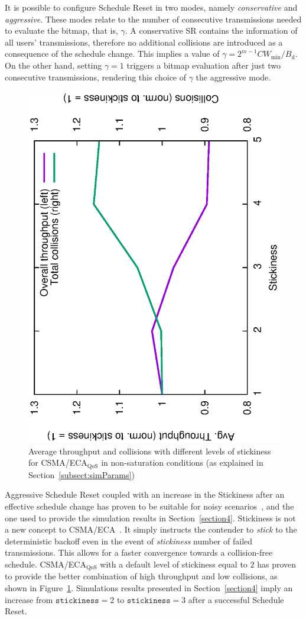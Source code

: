 It is possible to configure Schedule Reset in two modes, namely \emph{conservative} and \emph{aggressive}. These modes relate to the number of consecutive transmissions needed to evaluate the bitmap, that is, $\gamma$. A conservative SR contains the information of all users' transmissions, therefore no additional collisions are introduced as a consequence of the schedule change. This implies a value of $\gamma=2^{m-1}CW_{\min}/B_{\text{d}}$. On the other hand, setting $\gamma=1$ triggers a bitmap evaluation after just two consecutive transmissions, rendering this choice of $\gamma$ the aggressive mode.

\begin{figure}[tb]
	\centering
		\includegraphics[width=0.5\linewidth, angle=-90]{figures/stickEv-throughput-overallOnly.eps}
		\caption{Average throughput and collisions with different levels of stickiness for CSMA/ECA$_{\text{QoS}}$ in non-saturation conditions (as explained in Section~\ref{subsect:simParams})}
		\label{fig:stickEv-throughput-overallOnly}
	\end{figure}

Aggressive Schedule Reset coupled with an increase in the Stickiness after an effective schedule change has proven to be suitable for noisy scenarios~\cite{sanabria2014high}, and the one used to provide the simulation results in Section~\ref{section4}. Stickiness is not a new concept to CSMA/ECA~\cite{barcelo2011tcf}. It simply instructs the contender to \emph{stick} to the deterministic backoff even in the event of \emph{stickiness} number of failed transmissions. This allows for a faster convergence towards a collision-free schedule. CSMA/ECA$_{\text{QoS}}$ with a default level of stickiness equal to $2$ has proven to provide the better combination of high throughput and low collisions, as shown in Figure~\ref{fig:stickEv-throughput-overallOnly}. Simulations results presented in Section~\ref{section4} imply an increase from ${\texttt{stickiness}}=2$ to ${\texttt{stickiness}}=3$ after a successful Schedule Reset.

